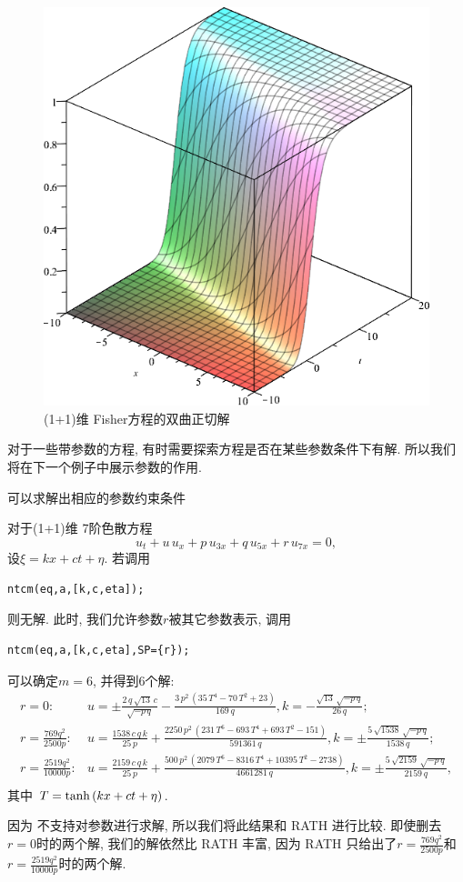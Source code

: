 \begin{example}
\begin{figure}[htbp]
\centering
\includegraphics[width=.45\textwidth]{fig/(1+1)Fisher-tanh.png}
\caption{(1+1)维 Fisher方程的双曲正切解\label{fisher-tanh}}
\end{figure}
    
\end{example}

对于一些带参数的方程, 有时需要探索方程是否在某些参数条件下有解. 所以我们将在下一个例子中展示参数的作用.

\begin{example}可以求解出相应的参数约束条件

对于(1+1)维 7阶色散方程\cite{duffy1996travelling}
\begin{equation}
    {{u}_{t}}+u\,{{u}_{x}}+p\,{{u}_{3x}}+q\,{{u}_{5x}}+r\,{{u}_{7x}}=0,
\end{equation}
设$\xi=kx+ct+\eta$. 若调用
\begin{verbatim}
ntcm(eq,a,[k,c,eta]);
\end{verbatim}
则无解. 此时, 我们允许参数$r$被其它参数表示, 调用
\begin{verbatim}
ntcm(eq,a,[k,c,eta],SP={r});
\end{verbatim}
可以确定$m=6$, 并得到6个解:
\begin{equation}
\renewcommand{\arraystretch}{1.4}
\begin{array}{rl}
r=0:& u=\pm \frac{2\,q\,\sqrt {13}\,c}{\sqrt {-p\,q}}-\frac{3\,{p}^{2}\,\left( 35\,{T}^{4}-70\,{T}^{2}+23\right) }{169\,q},k=-\frac{\sqrt {13}\,\sqrt {-p\,q}}{26\,q};\\
r=\frac{769 q^2}{2500 p}:& u=\frac{1538\,c\,q\,k}{25\,p}+\frac{2250\,{p}^{2}\,\left( 231\,{T}^{6}-693\,{T}^{4}+693\,{T}^{2}-151\right) }{591361\,q},k=\pm \frac{5\,\sqrt {1538}\,\sqrt {-p\,q}}{1538\,q};\\
r=\frac{2519 q^2}{10000 p}:& u=\frac{2159\,c\,q\,k}{25\,p}+\frac{500\,{p}^{2}\,\left( 2079\,{T}^{6}-8316\,{T}^{4}+10395\,{T}^{2}-2738\right) }{4661281\,q},k=\pm\frac{5\,\sqrt {2159}\,\sqrt {-p\,q}}{2159\,q}, \\
\end{array}
\end{equation}
其中 $T=\tanh\left(kx+ct+\eta\right)$. 

因为 不支持对参数进行求解, 所以我们将此结果和 RATH 进行比较. 即使删去$r=0$时的两个解, 我们的解依然比 RATH\cite[p21]{liu2001master} 丰富, 因为 RATH 只给出了$r=\frac{769 q^2}{2500 p}$和$r=\frac{2519 q^2}{10000 p}$时的两个解.
\end{example}

